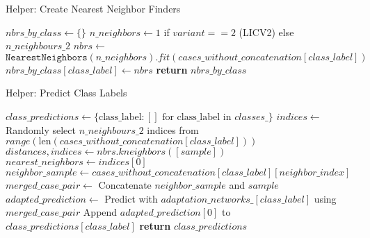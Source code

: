 \documentclass[a4paper, 12pt]{report}
\begin{document}
\begin{algorithm}[H]
    \caption{Helper: Create Nearest Neighbor Finders}
    \label{alg:create_nbrs_by_class}
    \begin{algorithmic}[1]
            \State $nbrs\_by\_class \gets \{\}$
                \State $n\_neighbors \gets 1$ if $variant == 2$ (LICV2) else $n\_neighbours\_2$
                \State $nbrs \gets$ $\texttt{NearestNeighbors}(n\_neighbors).fit(cases\_without\_concatenation[class\_label])$
                \State $nbrs\_by\_class[class\_label] \gets nbrs$
            \EndFor
            \State \textbf{return} $nbrs\_by\_class$
        \EndFunction
    \end{algorithmic}
\end{algorithm}
\begin{algorithm}[H]
    \caption{Helper: Predict Class Labels}
    \label{alg:predict_class}
    \begin{algorithmic}[1]
            \State $class\_predictions \gets \{\text{class\_label}: [] \text{ for class\_label in } classes\_\}$
                    \State $indices \gets$ Randomly select $n\_neighbours\_2$ indices from $range(\text{len}(cases\_without\_concatenation[class\_label]))$
                \Else
                    \State $distances, indices \gets nbrs.kneighbors([sample])$
                \EndIf
                \State $nearest\_neighbors \gets indices[0]$
                    \State $neighbor\_sample \gets cases\_without\_concatenation[class\_label][neighbor\_index]$
                    \State $merged\_case\_pair \gets$ Concatenate $neighbor\_sample$ and $sample$
                    \State $adapted\_prediction \gets$ Predict with $adaptation\_networks\_[class\_label]$ using $merged\_case\_pair$
                    \State Append $adapted\_prediction[0]$ to $class\_predictions[class\_label]$
                \EndFor
            \EndFor
            \State \textbf{return} $class\_predictions$
        \EndFunction
    \end{algorithmic}
\end{algorithm}
\end{document}
